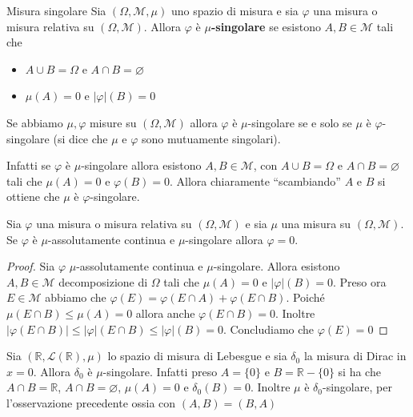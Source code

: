 \begin{definition}{Misura singolare}
    Sia \((\Omega, \mathcal{M}, \mu)\) uno spazio di misura e sia \(\varphi\)
    una misura o misura relativa su \((\Omega, \mathcal{M})\). Allora
    \(\varphi\) è \textbf{\(\mu\)-singolare} se esistono \(A, B \in
    \mathcal{M}\) tali che 
\begin{itemize}[label = --]
    \item \(A \cup B = \Omega\) e \(A \cap B = \varnothing\) 
    \item \(\mu(A) = 0\) e \(|\varphi |(B) = 0\) 
\end{itemize}
\end{definition}
\begin{remark}
    Se abbiamo \(\mu, \varphi \) misure su \((\Omega, \mathcal{M})\) allora
    \(\varphi \) è \(\mu\)-singolare se e solo se \(\mu\) è
    \(\varphi \)-singolare (si dice che \(\mu\) e \(\varphi\) sono mutuamente singolari).

    Infatti se \(\varphi \) è \(\mu\)-singolare allora esistono \(A, B \in
    \mathcal{M}\), con \(A\cup B =\Omega\) e \(A \cap B = \varnothing\)  tali
    che \(\mu(A) = 0\) e \(\varphi(B) = 0\). Allora chiaramente ``scambiando''
    \(A\) e \(B\) si ottiene che \(\mu\) è \(\varphi\)-singolare.
\end{remark}
\begin{proposition}
    Sia \(\varphi \) una misura o misura relativa su \((\Omega, \mathcal{M})\)
    e sia \(\mu\) una misura su \((\Omega, \mathcal{M})\). Se \(\varphi \) è
    \(\mu\)-assolutamente continua e \(\mu\)-singolare allora \(\varphi = 0\).
\end{proposition}
\begin{proof}
    Sia \(\varphi \) \(\mu\)-assolutamente continua e \(\mu\)-singolare. Allora
    esistono \\ \(A, B \in \mathcal{M}\) decomposizione di \(\Omega\)  tali che
    \(\mu(A) = 0\) e \(|\varphi |(B) =
    0\). Preso ora \(E \in \mathcal{M}\) abbiamo che \(\varphi (E) = \varphi (E
    \cap A) + \varphi (E \cap B)\). Poiché \(\mu(E\cap B) \le \mu(A) = 0\)
    allora anche \(\varphi (E \cap B) = 0\). Inoltre \(|\varphi (E \cap B)| \le
    |\varphi |(E \cap B) \le |\varphi |(B) = 0\). Concludiamo che \(\varphi (E)
    = 0\) 
\end{proof}
\begin{example}
    Sia \((\mathbb{R}, \mathcal{L}(\mathbb{R}), \mu)\) lo spazio di misura di
    Lebesgue e sia \(\delta_0\) la misura di Dirac in \(x=0\). Allora
    \(\delta_0\) è \(\mu\)-singolare. Infatti preso \(A = \{0\} \) e
    \(B=\mathbb{R}-\{0\} \) si ha che \(A \cap B = \mathbb{R}\), \(A \cap B =
    \varnothing\), \(\mu(A) = 0\) e \(\delta_0(B) = 0\).
    Inoltre \(\mu\) è \(\delta_0\)-singolare, per l'osservazione precedente
    ossia con \((A, B) = (B, A)\) 
\end{example}
